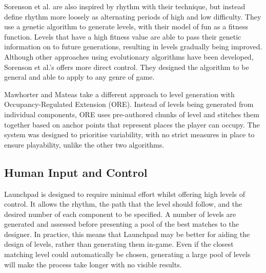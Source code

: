 \documentclass{scrartcl}
\begin{document}
Sorenson et al.\cite{sorenson:generic} are also inspired by rhythm with their technique, but instead define rhythm more loosely as alternating periods of high and low difficulty. They use a genetic algorithm to generate levels, with their model of fun as a fitness function. Levels that have a high fitness value are able to pass their genetic information on to future generations, resulting in levels gradually being improved. Although other approaches using evolutionary algorithms have been developed\cite{mourato:genetic}, Sorenson et al.'s offers more direct control. They designed the algorithm to be general and able to apply to any genre of game.

Mawhorter and Mateas\cite{mawhorter:occupancy} take a different approach to level generation with Occupancy-Regulated Extension (ORE). Instead of levels being generated from individual components, ORE uses pre-authored chunks of level and stitches them together based on anchor points that represent places the player can occupy. The system was designed to prioritise variability, with no strict measures in place to ensure playability, unlike the other two algorithms.

\subsection{Human Input and Control}
Launchpad is designed to require minimal effort whilst offering high levels of control. It allows the rhythm, the path that the level should follow, and the desired number of each component to be specified. A number of levels are generated and assessed before presenting a pool of the best matches to the designer. In practice, this means that Launchpad may be better for aiding the design of levels, rather than generating them in-game. Even if the closest matching level could automatically be chosen, generating a large pool of levels will make the process take longer with no visible results.
\end{document}
